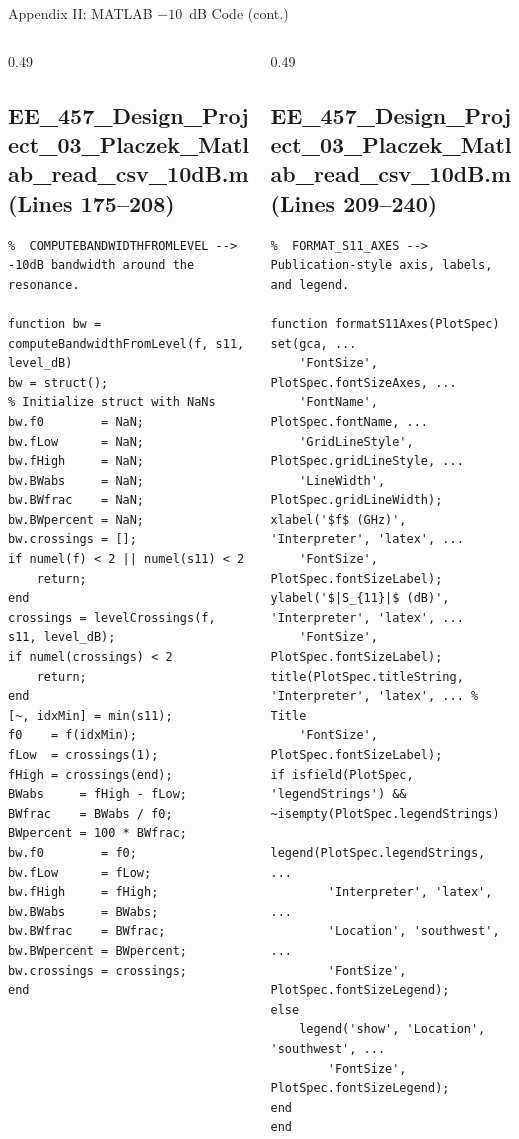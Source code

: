 \documentclass[compress,aspectratio=169,10pt]{beamer}
\begin{document}
\begin{frame}[fragile]{Appendix II: MATLAB $-10$~dB Code (cont.)}
    \begin{columns}[T]
        \begin{column}{0.49\textwidth}
\subsection[$-10$ dB code 5]{EE\_457\_Design\_Project\_03\_Placzek\_Matlab\_read\_csv\_10dB.m (Lines 175--208)}
            \begin{lstlisting}[firstnumber=175]
%% ------------------------------------------------------------------------
%  COMPUTEBANDWIDTHFROMLEVEL --> -10dB bandwidth around the resonance.

function bw = computeBandwidthFromLevel(f, s11, level_dB)
bw = struct();                                % Initialize struct with NaNs
bw.f0        = NaN;
bw.fLow      = NaN;
bw.fHigh     = NaN;
bw.BWabs     = NaN;
bw.BWfrac    = NaN;
bw.BWpercent = NaN;
bw.crossings = [];
if numel(f) < 2 || numel(s11) < 2
    return;
end
crossings = levelCrossings(f, s11, level_dB);
if numel(crossings) < 2
    return;
end
[~, idxMin] = min(s11);
f0    = f(idxMin);
fLow  = crossings(1);
fHigh = crossings(end);
BWabs     = fHigh - fLow;
BWfrac    = BWabs / f0;
BWpercent = 100 * BWfrac;
bw.f0        = f0;
bw.fLow      = fLow;
bw.fHigh     = fHigh;
bw.BWabs     = BWabs;
bw.BWfrac    = BWfrac;
bw.BWpercent = BWpercent;
bw.crossings = crossings;
end
            \end{lstlisting}
        \end{column}
        \begin{column}{0.49\textwidth}
\subsection[$-10$ dB code 6]{EE\_457\_Design\_Project\_03\_Placzek\_Matlab\_read\_csv\_10dB.m (Lines 209--240)}
            \begin{lstlisting}[firstnumber=209]
%% ------------------------------------------------------------------------
%  FORMAT_S11_AXES --> Publication-style axis, labels, and legend.

function formatS11Axes(PlotSpec)
set(gca, ...
    'FontSize', PlotSpec.fontSizeAxes, ...
    'FontName', PlotSpec.fontName, ...
    'GridLineStyle', PlotSpec.gridLineStyle, ...
    'LineWidth', PlotSpec.gridLineWidth);
xlabel('$f$ (GHz)', 'Interpreter', 'latex', ...
    'FontSize', PlotSpec.fontSizeLabel);
ylabel('$|S_{11}|$ (dB)', 'Interpreter', 'latex', ...
    'FontSize', PlotSpec.fontSizeLabel);
title(PlotSpec.titleString, 'Interpreter', 'latex', ... % Title
    'FontSize', PlotSpec.fontSizeLabel);
if isfield(PlotSpec, 'legendStrings') && ~isempty(PlotSpec.legendStrings)
    legend(PlotSpec.legendStrings, ...
        'Interpreter', 'latex', ...
        'Location', 'southwest', ...
        'FontSize', PlotSpec.fontSizeLegend);
else
    legend('show', 'Location', 'southwest', ...
        'FontSize', PlotSpec.fontSizeLegend);
end
end


\end{lstlisting}
\end{column}
\end{columns}
\end{frame}
\end{document}
